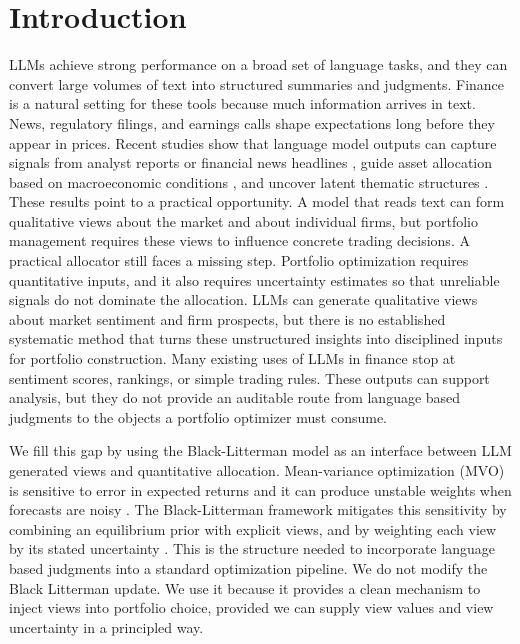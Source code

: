 \section{Introduction}
LLMs achieve strong performance on a broad set of language tasks, and they can convert large volumes of text into structured summaries and judgments. Finance is a natural setting for these tools because much information arrives in text. News, regulatory filings, and earnings calls shape expectations long before they appear in prices. Recent studies show that language model outputs can capture signals from analyst reports \citep{kim2023llms} or financial news headlines \citep{lopez2023can}, guide asset allocation based on macroeconomic conditions \citep{kim2023if}, and uncover latent thematic structures \citep{lee2025theme}. These results point to a practical opportunity. A model that reads text can form qualitative views about the market and about individual firms, but portfolio management requires these views to influence concrete trading decisions. A practical allocator still faces a missing step. Portfolio optimization requires quantitative inputs, and it also requires uncertainty estimates so that unreliable signals do not dominate the allocation. LLMs can generate qualitative views about market sentiment and firm prospects, but there is no established systematic method that turns these unstructured insights into disciplined inputs for portfolio construction. Many existing uses of LLMs in finance stop at sentiment scores, rankings, or simple trading rules. These outputs can support analysis, but they do not provide an auditable route from language based judgments to the objects a portfolio optimizer must consume.

We fill this gap by using the Black-Litterman model as an interface between LLM generated views and quantitative allocation. Mean-variance optimization (MVO) is sensitive to error in expected returns and it can produce unstable weights when forecasts are noisy \citep{best1991sensitivity, merton1980estimating, chung2022effects}. The Black-Litterman framework mitigates this sensitivity by combining an equilibrium prior with explicit views, and by weighting each view by its stated uncertainty \citep{black1992global}. This is the structure needed to incorporate language based judgments into a standard optimization pipeline. We do not modify the Black Litterman update. We use it because it provides a clean mechanism to inject views into portfolio choice, provided we can supply view values and view uncertainty in a principled way.

